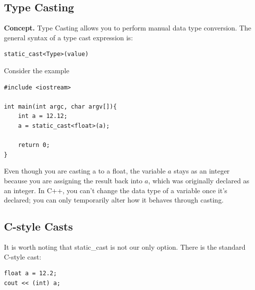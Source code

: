 \documentclass{report}
\begin{document}
    \subsection{Type Casting}
    \bigbreak \noindent 
    \textbf{Concept.} Type Casting allows you to perform manual data type conversion. The general syntax of a type cast expression is:
    \bigbreak \noindent 
    \sepline
    \begin{verbatim}
static_cast<Type>(value)
    \end{verbatim}
    \sepline
    \bigbreak \noindent 
    Consider the example
    \smallbreak \noindent
    \sepline
    \begin{verbatim}
#include <iostream>

int main(int argc, char argv[]){
    int a = 12.12;
    a = static_cast<float>(a);

    return 0;
}
    \end{verbatim}
    \sepline
    \bigbreak \noindent 
    Even though you are casting a to a float, the variable $a$ stays as an integer because you are assigning the result back into $a$, which was originally declared as an integer. In C++, you can't change the data type of a variable once it's declared; you can only temporarily alter how it behaves through casting.

    \bigbreak \noindent 
    \subsection{C-style Casts}
    \bigbreak \noindent 
    It is worth noting that static\_cast is not our only option. There is the standard C-style cast:
    \bigbreak \noindent 
    \sepline
    \begin{verbatim}
float a = 12.2;
cout << (int) a;
    \end{verbatim}
    \sepline
    




    \pagebreak \bigbreak \noindent 
\end{document}
